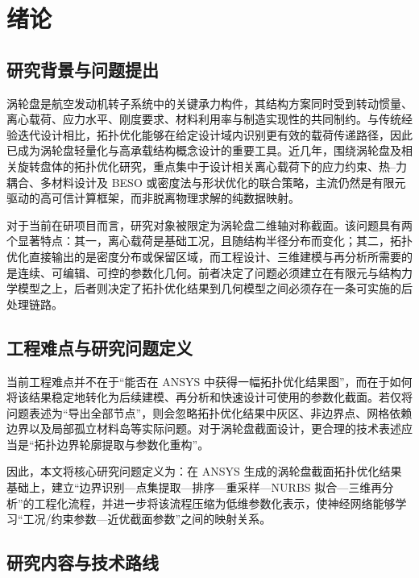 \documentclass{FRB-style}
\begin{document}
\clearpage
{}

\section{绪论}

\subsection{研究背景与问题提出}

涡轮盘是航空发动机转子系统中的关键承力构件，其结构方案同时受到转动惯量、离心载荷、应力水平、刚度要求、材料利用率与制造实现性的共同制约。与传统经验迭代设计相比，拓扑优化能够在给定设计域内识别更有效的载荷传递路径，因此已成为涡轮盘轻量化与高承载结构概念设计的重要工具。近几年，围绕涡轮盘及相关旋转盘体的拓扑优化研究，重点集中于设计相关离心载荷下的应力约束、热--力耦合、多材料设计及 BESO 或密度法与形状优化的联合策略，主流仍然是有限元驱动的高可信计算框架，而非脱离物理求解的纯数据映射\cite{Song2022,Yan2023,Meng2024,Wang2025,Yan2025MM}。

对于当前在研项目而言，研究对象被限定为涡轮盘二维轴对称截面。该问题具有两个显著特点：其一，离心载荷是基础工况，且随结构半径分布而变化；其二，拓扑优化直接输出的是密度分布或保留区域，而工程设计、三维建模与再分析所需要的是连续、可编辑、可控的参数化几何。前者决定了问题必须建立在有限元与结构力学模型之上，后者则决定了拓扑优化结果到几何模型之间必须存在一条可实施的后处理链路。

\subsection{工程难点与研究问题定义}

当前工程难点并不在于“能否在 ANSYS 中获得一幅拓扑优化结果图”，而在于如何将该结果稳定地转化为后续建模、再分析和快速设计可使用的参数化截面。若仅将问题表述为“导出全部节点”，则会忽略拓扑优化结果中灰区、非边界点、网格依赖边界以及局部孤立材料岛等实际问题。对于涡轮盘截面设计，更合理的技术表述应当是“拓扑边界轮廓提取与参数化重构”。

因此，本文将核心研究问题定义为：在 ANSYS 生成的涡轮盘截面拓扑优化结果基础上，建立“边界识别—点集提取—排序—重采样—NURBS 拟合—三维再分析”的工程化流程，并进一步将该流程压缩为低维参数化表示，使神经网络能够学习“工况/约束参数—近优截面参数”之间的映射关系。

\subsection{研究内容与技术路线}
\end{document}

